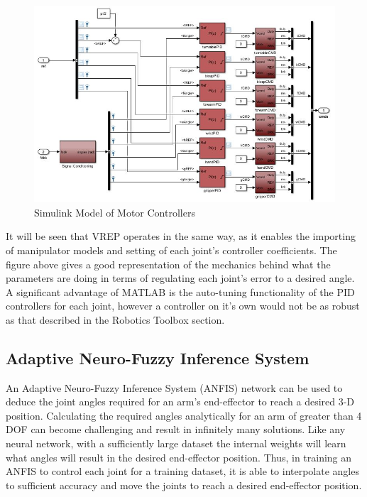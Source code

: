 \documentclass[12pt,openany,a4paper]{book}
\begin{document}
\begin{center}
\begin{figure}[htb]
  \includegraphics[width=\linewidth]{simulink_motor_control_PID.jpg}
\caption{Simulink Model of Motor Controllers}
\end{figure}
\end{center}

It will be seen that VREP operates in the same way, as it enables the importing of manipulator models and setting of each joint's controller coefficients. The figure above gives a good representation of the mechanics behind what the parameters are doing in terms of regulating each joint's error to a desired angle. A significant advantage of MATLAB is the auto-tuning functionality of the PID controllers for each joint, however a controller on it's own would not be as robust as that described in the Robotics Toolbox section.

\subsection{Adaptive Neuro-Fuzzy Inference System}
An Adaptive Neuro-Fuzzy Inference System (ANFIS) network can be used to deduce the joint angles required for an arm's end-effector to reach a desired 3-D position. Calculating the required angles analytically for an arm of greater than 4 DOF can become challenging and result in infinitely many solutions. Like any neural network, with a sufficiently large dataset the internal weights will learn what angles will result in the desired end-effector position. Thus, in training an ANFIS to control each joint for a training dataset, it is able to interpolate angles to sufficient accuracy and move the joints to reach a desired end-effector position.
\end{document}
